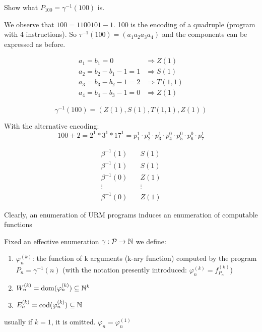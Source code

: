 \begin{example}
  Show what $P_{100} = \gamma^{-1}(100)$ is.

  We observe that $100 = 1100101 - 1$. 100 is the encoding of a
  quadruple (program with 4 instructions). So
  $\tau^{-1}(100) = (a_1 a_2 a_3 a_4)$ and the components can be
  expressed as before.

  \[
    \begin{split}
      a_1 = b_1 = 0 & \Rightarrow Z(1) \\
      a_2 = b_2 - b_1 - 1 = 1 & \Rightarrow S(1) \\
      a_3 = b_3 - b_2 - 1 = 2 & \Rightarrow T(1,1) \\
      a_4 = b_4 - b_3 - 1 = 0 & \Rightarrow Z(1)
    \end{split}
  \]

  \[\gamma^{-1}(100) = (Z(1), S(1), T(1,1), Z(1))\]

  With the alternative encoding:
  \[100 + 2 = 2^1 * 3^1 * 17^1 = p_1^1 \cdot p_2^1 \cdot p_3^1 \cdot
    p_4^0 \cdot p_5^0 \cdot p_6^0 \cdot p_7^1 \]

  \[
    \begin{split}
      \beta^{-1}(1) & \quad S(1) \\
      \beta^{-1}(1) & \quad S(1) \\
      \beta^{-1}(0) & \quad Z(1) \\
      \vdots & \quad\vdots \\
      \beta^{-1}(0) & \quad Z(1)
    \end{split}
  \]
\end{example}

Clearly, an enumeration of URM programs induces an enumeration of computable functions

\begin{definition}
  Fixed an effective enumeration
  $\gamma : \mathcal{P} \rightarrow \mathbb{N}$ we define:
  \begin{enumerate}[label=\arabic*.]
  \item $\varphi_n^{(k)}$: the function of k arguments (k-ary
    function) computed by the program $P_n = \gamma^{-1}(n)$ (with
    the notation presently introduced: $\varphi_n^{(k)} = f_{P_n}^{(k)}$)
  \item $W_n^{(k)} = \mbox{dom}(\varphi_n^{(k)}) \subseteq \mathbb{N}^k $
  \item $E_n^{(k)} = \mbox{cod}(\varphi_n^{(k)}) \subseteq \mathbb{N}$
  \end{enumerate}

  usually if $k=1$, it is omitted. $\varphi_n = \varphi_n^{(1)}$
\end{definition}

